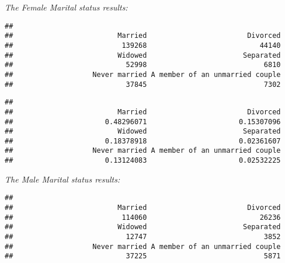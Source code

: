 \documentclass[]{article}
\newenvironment{Shaded}{\begin{snugshade}}{\end{snugshade}}
\newcommand{\KeywordTok}[1]{\textcolor[rgb]{0.13,0.29,0.53}{\textbf{#1}}}
\newcommand{\NormalTok}[1]{#1}
\newcommand{\OperatorTok}[1]{\textcolor[rgb]{0.81,0.36,0.00}{\textbf{#1}}}
\begin{document}
\emph{The Female Marital status results:}

\begin{Shaded}
\end{Shaded}

\begin{verbatim}
## 
##                         Married                        Divorced 
##                          139268                           44140 
##                         Widowed                       Separated 
##                           52998                            6810 
##                   Never married A member of an unmarried couple 
##                           37845                            7302
\end{verbatim}

\begin{Shaded}
\end{Shaded}

\begin{verbatim}
## 
##                         Married                        Divorced 
##                      0.48296071                      0.15307096 
##                         Widowed                       Separated 
##                      0.18378918                      0.02361607 
##                   Never married A member of an unmarried couple 
##                      0.13124083                      0.02532225
\end{verbatim}

\emph{The Male Marital status results:}

\begin{Shaded}
\end{Shaded}

\begin{verbatim}
## 
##                         Married                        Divorced 
##                          114060                           26236 
##                         Widowed                       Separated 
##                           12747                            3852 
##                   Never married A member of an unmarried couple 
##                           37225                            5871
\end{verbatim}
\end{document}
